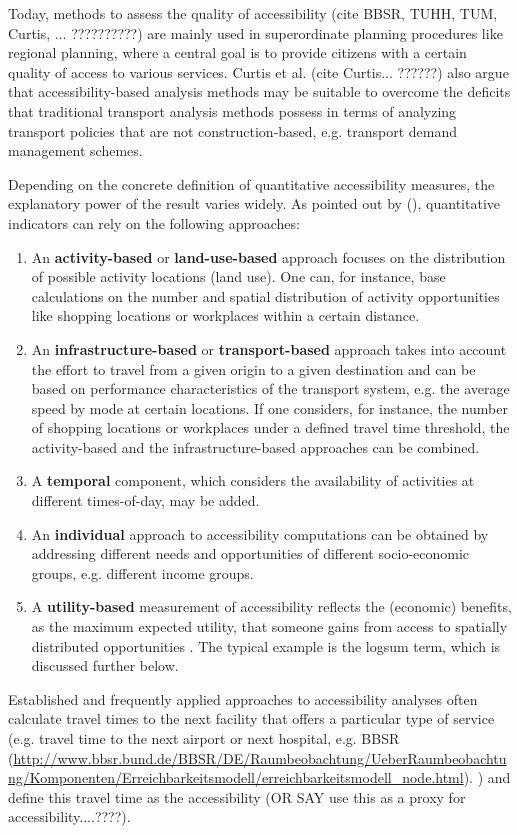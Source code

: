 Today, methods to assess the quality of accessibility (cite BBSR, TUHH, TUM, Curtis, ... ??????????) are mainly used in superordinate planning procedures like regional planning, where a central goal is to provide citizens with a certain quality of access to various services. Curtis et al. (cite Curtis... ??????) also argue that accessibility-based analysis methods may be suitable to overcome the deficits that traditional transport analysis methods possess in terms of analyzing transport policies that are not construction-based, e.g. transport demand management schemes.

Depending on the concrete definition of quantitative accessibility measures, the explanatory power of the result varies widely. As pointed out by \citet{NicolaiNagel2012HiResAccessibilityMethodInBook} (\citep[see also][]{GeursRitsema2001AccessibilityMeasures,Geurs2004AccessibilityReview}), quantitative indicators can rely on the following approaches:
%
\begin{enumerate}
\item An \textbf{activity-based} or \textbf{land-use-based} approach focuses on
the distribution of possible activity locations (land use). One can, for instance,
base calculations on the number and spatial distribution of activity opportunities
like shopping locations or workplaces within a certain distance.
%
\item An \textbf{in\-fra\-struc\-ture-based} or \textbf{transport-based} approach takes into account the effort to travel from a given origin to a given destination and 
can be based on performance characteristics of the transport system, e.g. the
average speed by mode at certain locations. If one considers, for instance, the
number of shopping locations or workplaces under a defined travel time threshold,
the activity-based and the infrastructure-based approaches can be combined.
%
\item A \textbf{temporal} component, which considers the availability of activities at different times-of-day, may be added.
%
\item An \textbf{individual} approach to accessibility computations can be
obtained by addressing different needs and opportunities of different socio-economic groups, e.g. different income groups.
%
\item A \textbf{utility-based} measurement of accessibility reflects the
(economic) benefits, as the maximum expected utility, that someone gains
from access to spatially distributed opportunities
\citep{GeursRitsema2001AccessibilityMeasures,deJongEtAl2007LogsumTRA}. The
typical example is the logsum term, which is discussed further below.
\end{enumerate}
%
%
Established and frequently applied approaches to accessibility analyses often calculate travel times to the next facility that offers a particular type of service (e.g. travel time to the next airport or next hospital, e.g. BBSR (\url{http://www.bbsr.bund.de/BBSR/DE/Raumbeobachtung/UeberRaumbeobachtung/Komponenten/Erreichbarkeitsmodell/erreichbarkeitsmodell_node.html}). ) and define this travel time as the accessibility (OR SAY use this as a proxy for accessibility....????).

